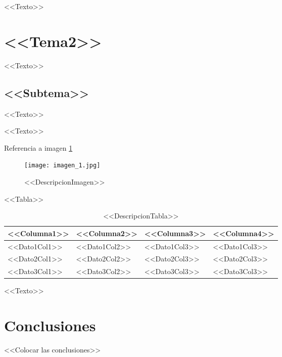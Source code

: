 \documentclass[12pt,letterpaper]{article}
\begin{document}
<<Texto>>


\newpage

\section{<<Tema2>>}

<<Texto>>

\subsection{<<Subtema>>}

<<Texto>>

<<Texto>>

Referencia a imagen \ref{fig:imagen_1}

\begin{figure}[H]
  \centering
  \texttt{[image: imagen\_1.jpg]}
  \caption{<<DescripcionImagen>>}
  \label{fig:imagen_1}
\end{figure}

<<Tabla>>

\begin{table}[H]
\centering
\begin{tabular}{|p{3.5cm}|p{3.5cm}|p{3.5cm}|p{3.5cm}|}
\hline
\textbf{<<Columna1>>} & \textbf{<<Columna2>>} & \textbf{<<Columna3>>} & \textbf{<<Columna4>>} \\
\hline
<<Dato1Col1>> & <<Dato1Col2>> & <<Dato1Col3>> & <<Dato1Col3>> \\
\hline
<<Dato2Col1>> & <<Dato2Col2>> & <<Dato2Col3>> & <<Dato2Col3>> \\
\hline
<<Dato3Col1>> & <<Dato3Col2>> & <<Dato3Col3>> & <<Dato3Col3>> \\
\hline
\end{tabular}
\caption{<<DescripcionTabla>>}
\end{table}

\bigskip

\noindent
<<Texto>>
\newpage

\section{Conclusiones}

<<Colocar las conclusiones>>

\newpage
\end{document}

